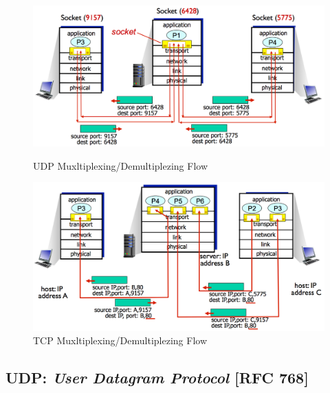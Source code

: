 \documentclass[12pt]{article}
\begin{document}
\begin{figure}[!hbpt]
  \includegraphics[width=\textwidth]{images/udp_mux.png}
  \caption{UDP Muxltiplexing/Demultiplezing Flow}
  \label{fig:udp_mux}

  \includegraphics[width=\textwidth]{images/tcp_mux.png}
  \caption{TCP Muxltiplexing/Demultiplezing Flow}
  \label{fig:tcp_mux}
\end{figure}

\subsection{UDP: \textit{User Datagram Protocol} [RFC 768]} %





\end{document}
